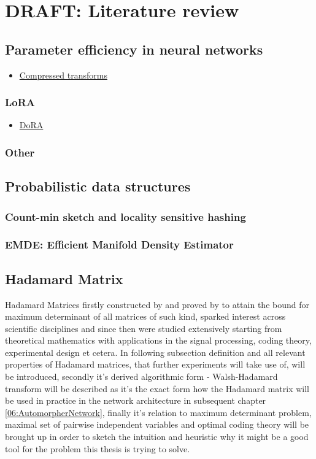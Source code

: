 \section{DRAFT: Literature review}
\subsection{Parameter efficiency in neural networks}
\begin{itemize}
    \item \href{https://arxiv.org/abs/1810.02309}{Compressed transforms}
\end{itemize}
\subsubsection{LoRA}
\begin{itemize}
    \item \href{https://arxiv.org/pdf/2402.09353.pdf}{DoRA}
\end{itemize}
\subsubsection{Other}

\subsection{Probabilistic data structures}
\subsubsection{Count-min sketch and locality sensitive hashing}
\subsubsection{EMDE: Efficient Manifold Density Estimator}

\subsection{Hadamard Matrix}
Hadamard Matrices firstly constructed by \cite{05_sylvester_construction} and proved by \cite{05_hadamard_maximal_determinant} to attain the bound for maximum determinant of all matrices of such kind, sparked interest across scientific disciplines and since then were studied extensively starting from theoretical mathematics with applications in the signal processing, coding theory, experimental design et cetera. In following subsection definition and all relevant properties of Hadamard matrices, that further experiments will take use of, will be introduced, secondly it's derived algorithmic form - Walsh-Hadamard transform will be described as it's the exact form how the Hadamard matrix will be used in practice in the network architecture in subsequent chapter \ref{06:AutomorpherNetwork}, finally it's relation to maximum determinant problem, maximal set of pairwise independent variables and optimal coding theory will be brought up in order to sketch the intuition and heuristic why it might be a good tool for the problem this thesis is trying to solve.

